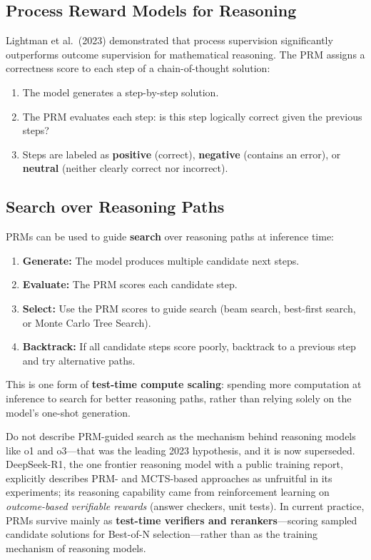 \subsection{Process Reward Models for Reasoning}

Lightman et al.\ (2023) demonstrated that process supervision significantly
outperforms outcome supervision for mathematical reasoning.  The PRM
assigns a correctness score to each step of a chain-of-thought solution:

\begin{enumerate}[leftmargin=*]
\item The model generates a step-by-step solution.
\item The PRM evaluates each step: is this step logically correct given the
  previous steps?
\item Steps are labeled as \textbf{positive} (correct), \textbf{negative}
  (contains an error), or \textbf{neutral} (neither clearly correct nor
  incorrect).
\end{enumerate}

\subsection{Search over Reasoning Paths}

PRMs can be used to guide \textbf{search} over reasoning paths at
inference time:

\begin{enumerate}[leftmargin=*]
\item \textbf{Generate:} The model produces multiple candidate next steps.
\item \textbf{Evaluate:} The PRM scores each candidate step.
\item \textbf{Select:} Use the PRM scores to guide search (beam search,
  best-first search, or Monte Carlo Tree Search).
\item \textbf{Backtrack:} If all candidate steps score poorly, backtrack
  to a previous step and try alternative paths.
\end{enumerate}

This is one form of \textbf{test-time compute scaling}: spending more
computation at inference to search for better reasoning paths, rather than
relying solely on the model's one-shot generation.

\begin{warningbox}
Do not describe PRM-guided search as the mechanism behind reasoning models
like o1 and o3---that was the leading 2023 hypothesis, and it is now
superseded.  DeepSeek-R1, the one frontier reasoning model with a public
training report, explicitly describes PRM- and MCTS-based approaches as
unfruitful in its experiments; its reasoning capability came from
reinforcement learning on \emph{outcome-based verifiable rewards} (answer
checkers, unit tests).  In current practice, PRMs survive mainly as
\textbf{test-time verifiers and rerankers}---scoring sampled candidate
solutions for Best-of-N selection---rather than as the training mechanism
of reasoning models.
\end{warningbox}

